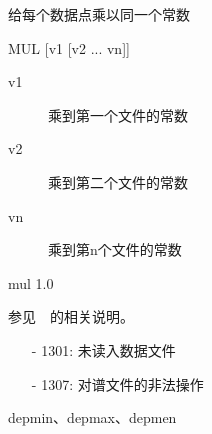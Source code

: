 \label{cmd:mul}

给每个数据点乘以同一个常数

\begin{SACSTX}
MUL [v1 [v2 ... vn]]
\end{SACSTX}

\begin{description}
\item [v1] 乘到第一个文件的常数 
\item [v2] 乘到第二个文件的常数 
\item [vn] 乘到第n个文件的常数 
\end{description}

\begin{SACDFT}
mul 1.0
\end{SACDFT}

参见~~的相关说明。

\begin{itemize}
\item[-]1301: 未读入数据文件
\item[-]1307: 对谱文件的非法操作
\end{itemize}

depmin、depmax、depmen
